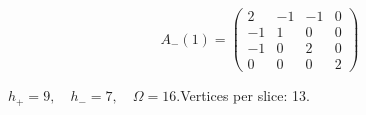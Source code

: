 \begin{minipage}{\linewidth}
\begin{minipage}[c]{0.495\linewidth}
\end{minipage}%
\begin{minipage}[c]{0.495\linewidth}\centering\fontsize{9.7}{12}\selectfont
\setlength{\abovedisplayskip}{4pt}\setlength{\belowdisplayskip}{4pt}
\setlength{\abovedisplayshortskip}{4pt}\setlength{\belowdisplayshortskip}{4pt}
\setlength{\arraycolsep}{3pt}\renewcommand{\arraystretch}{1.08}
\[A_{-}(1)=\begin{pmatrix}2 & -1 & -1 & 0\\-1 & 1 & 0 & 0\\-1 & 0 & 2 & 0\\0 & 0 & 0 & 2\end{pmatrix}\]
\end{minipage}%
\par\smallskip\noindent\small $h_+=9,\quad h_-=7,\quad \Omega=16.$\quad Vertices per slice: 13.
\end{minipage}\par\vfill
